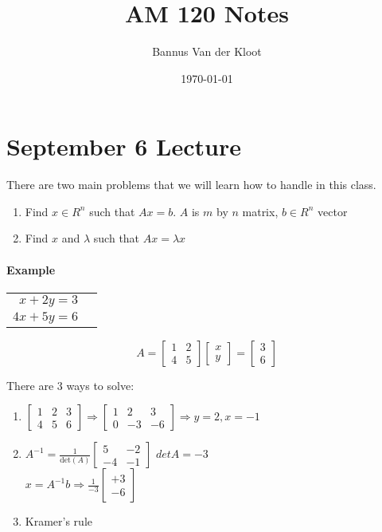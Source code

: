 \documentclass[12pt]{article}
\title{AM 120 Notes}
\date{\today}
\author{Bannus Van der Kloot}
\newcommand{\<}{\langle}
\renewcommand{\>}{\rangle}
\begin{document}
\maketitle

\tableofcontents

\section{September 6 Lecture}

There are two main problems that we will learn how to handle in this class.

\begin{enumerate}
	\item Find $x \in R^n$ such that $Ax=b$. $A$ is $m$ by $n$ matrix, $b \in R^n$ vector
	\item Find $x$ and $\lambda$ such that $Ax = \lambda x$
\end{enumerate}

\paragraph{Example}

\begin{tabular}{rr}
	$x + 2y = 3$ \\
	$4x + 5y = 6$
\end{tabular}

$$ A =
\begin{bmatrix}
	1 & 2 \\
	4 & 5 
\end{bmatrix}
\begin{bmatrix}
	x \\ y
\end{bmatrix}
=
\begin{bmatrix}
	3 \\ 6
\end{bmatrix}
$$

There are 3 ways to solve:
\begin{enumerate}
	\item $\begin{bmatrix}
		1 & 2 & 3 \\
		4 & 5 & 6
	\end{bmatrix} \Rightarrow
	\begin{bmatrix}
		1 & 2 & 3 \\
		0 & -3 & -6
	\end{bmatrix}\Rightarrow
	y=2,x=-1$ 
	\item $A^{-1}=\frac{1}{\text{det}(A)}
	\begin{bmatrix}
		5 & -2 \\
		-4 & -1 
	\end{bmatrix}$
	$det A = -3$ \\
	$x=A^{-1}b \Rightarrow \frac{1}{-3}
	\begin{bmatrix}
		+3 \\ -6
	\end{bmatrix}$
	\item Kramer's rule
\end{enumerate}
\end{document}
